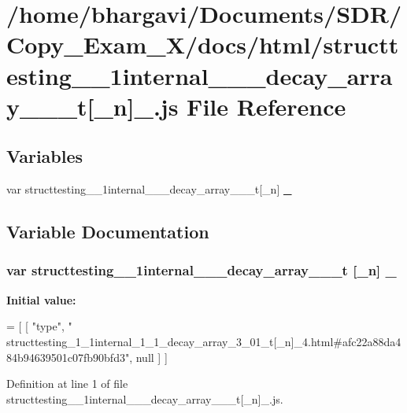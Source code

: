 \hypertarget{structtesting__1__1internal__1__1__decay__array__3__01__t[__n]__4_8js}{}\section{/home/bhargavi/\+Documents/\+S\+D\+R/\+Copy\+\_\+\+Exam\+\_\+X/docs/html/structtesting\+\_\+\_\+1internal\+\_\+\_\+\_\+decay\+\_\+array\+\_\+\_\+\_\+t\mbox{[}\+\_\+n\mbox{]}\+\_.\+js File Reference}
\label{structtesting__1__1internal__1__1__decay__array__3__01__t[__n]__4_8js}
\subsection*{Variables}
\begin{DoxyCompactItemize}
\item 
var structtesting\+\_\+\_\+1internal\+\_\+\_\+\_\+decay\+\_\+array\+\_\+\_\+\_\+t\mbox{[}\+\_\+n\mbox{]} \hyperlink{structtesting__1__1internal__1__1__decay__array__3__01__t[__n]__4_8js_a62f3445f681f3179f39b8982b9d42680}{\+\_}
\end{DoxyCompactItemize}


\subsection{Variable Documentation}
\subsubsection[{\texorpdfstring{\+\_\+4}{_4}}]{\setlength{\rightskip}{0pt plus 5cm}var structtesting\+\_\+\_\+1internal\+\_\+\_\+\_\+decay\+\_\+array\+\_\+\_\+\_\+t \mbox{[}\+\_\+n\mbox{]} \+\_}\hypertarget{structtesting__1__1internal__1__1__decay__array__3__01__t[__n]__4_8js_a62f3445f681f3179f39b8982b9d42680}{}\label{structtesting__1__1internal__1__1__decay__array__3__01__t[__n]__4_8js_a62f3445f681f3179f39b8982b9d42680}
{\bfseries Initial value\+:}
\begin{DoxyCode}
=
[
    [ \textcolor{stringliteral}{"type"}, \textcolor{stringliteral}{"
      structtesting\_1\_1internal\_1\_1\_decay\_array\_3\_01\_t[\_n]\_4.html#afc22a88da484b94639501c07fb90bfd3"}, null ]
]
\end{DoxyCode}


Definition at line 1 of file structtesting\+\_\+\_\+1internal\+\_\+\_\+\_\+decay\+\_\+array\+\_\+\_\+\_\+t\mbox{[}\+\_\+n\mbox{]}\+\_.\+js.

